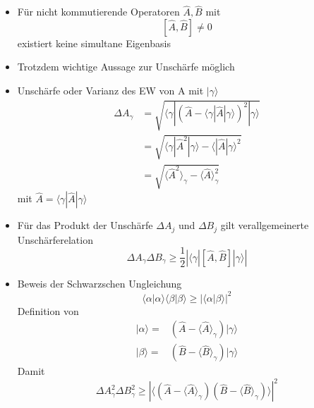 \documentclass[10pt,article,colorback,accentcolor=tud9d]{scrartcl}
\begin{document}
  \begin{itemize}
    \item Für nicht kommutierende Operatoren $\hat{A},\hat{B}$ mit 
      $$
      \left[\hat{A},\hat{B}\right]\neq 0
      $$
      existiert keine simultane Eigenbasis
    \item Trotzdem wichtige Aussage zur Unschärfe möglich
    \item Unschärfe oder Varianz des EW von A mit $|\gamma\rangle$
      \begin{equation}
      \begin{aligned}
        \Delta A_\gamma&=\sqrt{\langle\gamma|\left(\hat{A}-\langle\gamma|\hat{A}|\gamma\rangle\right)^2|\gamma\rangle}\\
        &=\sqrt{\langle\gamma|\hat{A}^2|\gamma\rangle-\langle|\hat{A}|\gamma\rangle^2}\\
        &=\sqrt{\langle\hat{A}^2\rangle_\gamma-\langle\hat{A}\rangle_\gamma^2}
      \end{aligned}        
      \end{equation}
      mit $\hat{A}=\langle\gamma|\hat{A}|\gamma\rangle$
    \item Für das Produkt der Unschärfe $\Delta A_j$ und $\Delta B_j$ gilt verallgemeinerte Unschärferelation
      \begin{equation}
      \Delta A_\gamma \Delta B_\gamma \geq \frac{1}{2}\left|\langle\gamma\left|\left[ \hat{A},\hat{B}\right]\right|\gamma\rangle\right|
      \end{equation}
    \item Beweis der Schwarzschen Ungleichung
      \begin{equation}
      \langle\alpha|\alpha\rangle\langle\beta|\beta\rangle \geq \left|\langle\alpha|\beta\rangle\right|^2
      \end{equation}
      Definition von 
      \begin{equation}
      \begin{aligned}
        |\alpha\rangle=&\left(\hat{A}-\langle\hat{A}\rangle_\gamma\right)|\gamma\rangle\\
        |\beta\rangle=&\left(\hat{B}-\langle\hat{B}\rangle_\gamma\right)|\gamma\rangle
      \end{aligned}
      \end{equation}
      Damit 
      \begin{equation}
      \Delta A_\gamma^2\Delta B_\gamma^2 \geq \left|\langle \left(\hat{A}-\langle\hat{A}\rangle_\gamma\right)\left(\hat{B}-\langle\hat{B}\rangle_\gamma\right)\rangle\right|^2

\end{equation}
\end{itemize}
\end{document}
